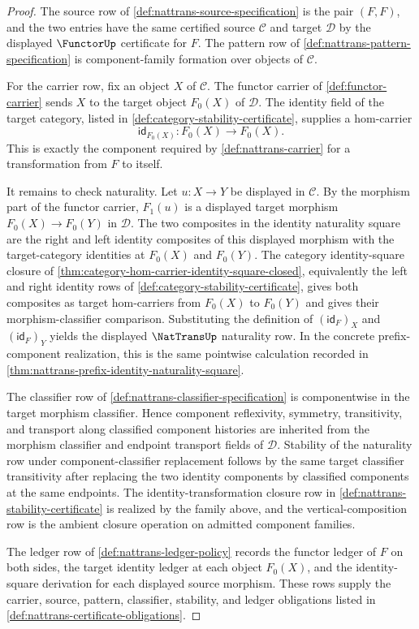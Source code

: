 \begin{proof}
The source row of \autoref{def:nattrans-source-specification} is the pair $(F,F)$, and the two entries have the same certified source $\mathcal C$ and target $\mathcal D$ by the displayed $\FunctorUp$ certificate for $F$. The pattern row of \autoref{def:nattrans-pattern-specification} is component-family formation over objects of $\mathcal C$.

For the carrier row, fix an object $X$ of $\mathcal C$. The functor carrier of \autoref{def:functor-carrier} sends $X$ to the target object $F_0(X)$ of $\mathcal D$. The identity field of the target category, listed in \autoref{def:category-stability-certificate}, supplies a hom-carrier
$$
\mathsf{id}_{F_0(X)}:F_0(X)\to F_0(X).
$$
This is exactly the component required by \autoref{def:nattrans-carrier} for a transformation from $F$ to itself.

It remains to check naturality. Let $u:X\to Y$ be displayed in $\mathcal C$. By the morphism part of the functor carrier, $F_1(u)$ is a displayed target morphism $F_0(X)\to F_0(Y)$ in $\mathcal D$. The two composites in the identity naturality square are the right and left identity composites of this displayed morphism with the target-category identities at $F_0(X)$ and $F_0(Y)$. The category identity-square closure of \autoref{thm:category-hom-carrier-identity-square-closed}, equivalently the left and right identity rows of \autoref{def:category-stability-certificate}, gives both composites as target hom-carriers from $F_0(X)$ to $F_0(Y)$ and gives their morphism-classifier comparison. Substituting the definition of $(\mathsf{id}_F)_X$ and $(\mathsf{id}_F)_Y$ yields the displayed $\NatTransUp$ naturality row. In the concrete prefix-component realization, this is the same pointwise calculation recorded in \autoref{thm:nattrans-prefix-identity-naturality-square}.

The classifier row of \autoref{def:nattrans-classifier-specification} is componentwise in the target morphism classifier. Hence component reflexivity, symmetry, transitivity, and transport along classified component histories are inherited from the morphism classifier and endpoint transport fields of $\mathcal D$. Stability of the naturality row under component-classifier replacement follows by the same target classifier transitivity after replacing the two identity components by classified components at the same endpoints. The identity-transformation closure row in \autoref{def:nattrans-stability-certificate} is realized by the family above, and the vertical-composition row is the ambient closure operation on admitted component families.

The ledger row of \autoref{def:nattrans-ledger-policy} records the functor ledger of $F$ on both sides, the target identity ledger at each object $F_0(X)$, and the identity-square derivation for each displayed source morphism. These rows supply the carrier, source, pattern, classifier, stability, and ledger obligations listed in \autoref{def:nattrans-certificate-obligations}.
\end{proof}

